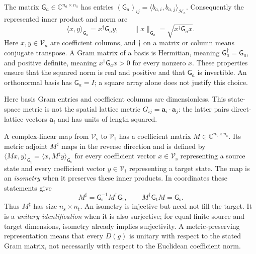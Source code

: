 \begin{definition}
\label{def:symmetry-state-gram}
The matrix $\mathsf G_a\in\mathbb C^{n_a\times n_a}$ has entries
$(\mathsf G_a)_{ij}=\langle b_{a,i},b_{a,j}\rangle_{\mathcal H_a}$.
Consequently the represented inner product and norm are
\begin{equation}
  \langle x,y\rangle_{\mathsf G_a}=x^{\dagger}\mathsf G_a y,
  \qquad \|x\|_{\mathsf G_a}=\sqrt{x^{\dagger}\mathsf G_a x}.
  \label{eq:symmetry-coordinate-inner-product}
\end{equation}
Here $x,y\in\mathcal V_a$ are coefficient columns, and $\dagger$ on a matrix
or column means conjugate transpose. A Gram matrix of a basis is Hermitian,
meaning $\mathsf G_a^{\dagger}=\mathsf G_a$, and positive definite, meaning
$x^{\dagger}\mathsf G_a x>0$ for every nonzero $x$. These properties ensure
that the squared norm is real and positive and that $\mathsf G_a$ is invertible.
An orthonormal basis has $\mathsf G_a=I$; a square array alone does not justify
this choice.
\end{definition}

Here basis Gram entries and coefficient columns are dimensionless. This
state-space metric is not the spatial lattice metric
$G_{ij}=\mathbf a_i\cdot\mathbf a_j$: the latter pairs direct-lattice vectors
$\mathbf a_i$ and has units of length squared.

\begin{definition}
\label{def:symmetry-metric-map}
A complex-linear map from $\mathcal V_{\mathrm s}$ to $\mathcal V_{\mathrm t}$
has a coefficient matrix $M\in\mathbb C^{n_{\mathrm t}\times n_{\mathrm s}}$.
Its metric adjoint $M^{\sharp}$ maps in the reverse direction and is defined
by $\langle Mx,y\rangle_{\mathsf G_{\mathrm t}}
=\langle x,M^{\sharp}y\rangle_{\mathsf G_{\mathrm s}}$ for every coefficient
vector $x\in\mathcal V_{\mathrm s}$ representing a source state and every
coefficient vector $y\in\mathcal V_{\mathrm t}$ representing a target state. The map is an \emph{isometry} when it
preserves these inner products. In coordinates these statements give
\begin{equation}
  M^{\sharp}=\mathsf G_{\mathrm s}^{-1}M^{\dagger}\mathsf G_{\mathrm t},
  \qquad M^{\dagger}\mathsf G_{\mathrm t}M=\mathsf G_{\mathrm s}.
  \label{eq:symmetry-metric-isometry}
\end{equation}
Thus $M^{\sharp}$ has size $n_{\mathrm s}\times n_{\mathrm t}$.
An isometry is injective but need not fill the target. It is a \emph{unitary
identification} when it is also surjective; for equal finite source and target
dimensions, isometry already implies surjectivity. A metric-preserving
representation means that every $D(g)$ is unitary with respect to the stated
Gram matrix, not necessarily with respect to the Euclidean coefficient norm.
\end{definition}

